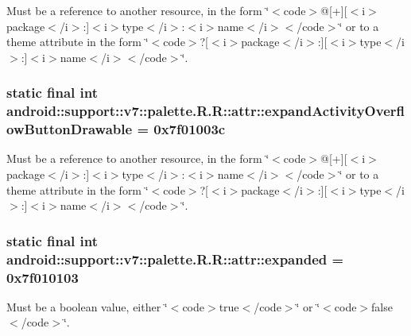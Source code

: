 Must be a reference to another resource, in the form \char`\"{}$<$code$>$@\mbox{[}+\mbox{]}\mbox{[}$<$i$>$package$<$/i$>$:\mbox{]}$<$i$>$type$<$/i$>$:$<$i$>$name$<$/i$>$$<$/code$>$\char`\"{} or to a theme attribute in the form \char`\"{}$<$code$>$?\mbox{[}$<$i$>$package$<$/i$>$:\mbox{]}\mbox{[}$<$i$>$type$<$/i$>$:\mbox{]}$<$i$>$name$<$/i$>$$<$/code$>$\char`\"{}. \hypertarget{classandroid_1_1support_1_1v7_1_1palette_1_1_r_1_1attr_84fb3f294aef86590a122f53d6d5dd0e}{
\subsubsection[{expandActivityOverflowButtonDrawable}]{\setlength{\rightskip}{0pt plus 5cm}static final int android::support::v7::palette.R.R::attr::expandActivityOverflowButtonDrawable = 0x7f01003c}}
\label{classandroid_1_1support_1_1v7_1_1palette_1_1_r_1_1attr_84fb3f294aef86590a122f53d6d5dd0e}


Must be a reference to another resource, in the form \char`\"{}$<$code$>$@\mbox{[}+\mbox{]}\mbox{[}$<$i$>$package$<$/i$>$:\mbox{]}$<$i$>$type$<$/i$>$:$<$i$>$name$<$/i$>$$<$/code$>$\char`\"{} or to a theme attribute in the form \char`\"{}$<$code$>$?\mbox{[}$<$i$>$package$<$/i$>$:\mbox{]}\mbox{[}$<$i$>$type$<$/i$>$:\mbox{]}$<$i$>$name$<$/i$>$$<$/code$>$\char`\"{}. \hypertarget{classandroid_1_1support_1_1v7_1_1palette_1_1_r_1_1attr_f1194071a1a4bab1b5fc970394a7ac9a}{
\subsubsection[{expanded}]{\setlength{\rightskip}{0pt plus 5cm}static final int android::support::v7::palette.R.R::attr::expanded = 0x7f010103}}
\label{classandroid_1_1support_1_1v7_1_1palette_1_1_r_1_1attr_f1194071a1a4bab1b5fc970394a7ac9a}


Must be a boolean value, either \char`\"{}$<$code$>$true$<$/code$>$\char`\"{} or \char`\"{}$<$code$>$false$<$/code$>$\char`\"{}. 

